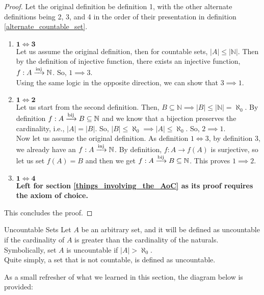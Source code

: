 \begin{proof}
    Let the original definition be definition 1, with the other alternate definitions being 2, 3, and 4 in the order of their presentation in definition \eqref{alternate_countable_set}.
    \begin{enumerate}
        \item $\pmb{1\iff 3}$\\
        Let us assume the original definition, then for countable sets, $|A|\leq|\mathbb{N}|$. Then by the definition of injective function, there exists an injective function, $f:A\xrightarrow{\rm inj}\mathbb{N}$. So, $1\implies 3$.\\
        Using the same logic in the opposite direction, we can show that $3\implies 1$.
        \item $\pmb{1\iff 2}$\\
        Let us start from the second definition. Then, $B\subseteq\mathbb{N}\implies|B|\leq|\mathbb{N}|=\aleph_0$. By definition $f:A\xrightarrow{\rm bij}B\subseteq\mathbb{N}$ and we know that a bijection preserves the cardinality, i.e., $|A|=|B|$. So, $|B|\leq\aleph_0\implies|A|\leq\aleph_0$. So, $2\implies 1$.\\
        Now let us assume the original definition. As definition $1\iff 3$, by definition 3, we already have an $f:A\xrightarrow{\rm inj}\mathbb{N}$. By definition, $f:A\to f(A)$ is surjective, so let us set $f(A)=B$ and then we get $f:A\xrightarrow{\rm bij}B\subseteq\mathbb{N}$. This proves $1\implies 2$.
        \item $\pmb{1\iff 4}$\\
        \textbf{Left for section \eqref{things_involving_the_AoC} as its proof requires the axiom of choice.}
    \end{enumerate}
    This concludes the proof.
\end{proof}
\begin{Definition}{Uncountable Sets}\label{uncountable_set}
    Let $A$ be an arbitrary set, and it will be defined as uncountable if the cardinality of $A$ is greater than the cardinality of the naturals. Symbolically, set $A$ is uncountable if $|A|>\aleph_0$.\\
    Quite simply, a set that is not countable, is defined as uncountable.
\end{Definition}
\noindent As a small refresher of what we learned in this section, the diagram below is provided:
